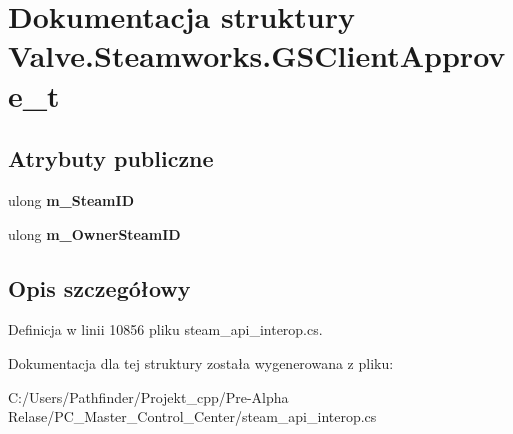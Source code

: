 \hypertarget{struct_valve_1_1_steamworks_1_1_g_s_client_approve__t}{}\section{Dokumentacja struktury Valve.\+Steamworks.\+G\+S\+Client\+Approve\+\_\+t}
\label{struct_valve_1_1_steamworks_1_1_g_s_client_approve__t}
\subsection*{Atrybuty publiczne}
\begin{DoxyCompactItemize}
\item 
\mbox{\label{struct_valve_1_1_steamworks_1_1_g_s_client_approve__t_a069979c6ace4628d721bfbeddd993b1d}} 
ulong {\bfseries m\+\_\+\+Steam\+ID}
\item 
\mbox{\label{struct_valve_1_1_steamworks_1_1_g_s_client_approve__t_a5cabb2a9993b7b525e0fb82eeac61716}} 
ulong {\bfseries m\+\_\+\+Owner\+Steam\+ID}
\end{DoxyCompactItemize}


\subsection{Opis szczegółowy}


Definicja w linii 10856 pliku steam\+\_\+api\+\_\+interop.\+cs.



Dokumentacja dla tej struktury została wygenerowana z pliku\+:\begin{DoxyCompactItemize}
\item 
C\+:/\+Users/\+Pathfinder/\+Projekt\+\_\+cpp/\+Pre-\/\+Alpha Relase/\+P\+C\+\_\+\+Master\+\_\+\+Control\+\_\+\+Center/steam\+\_\+api\+\_\+interop.\+cs\end{DoxyCompactItemize}
